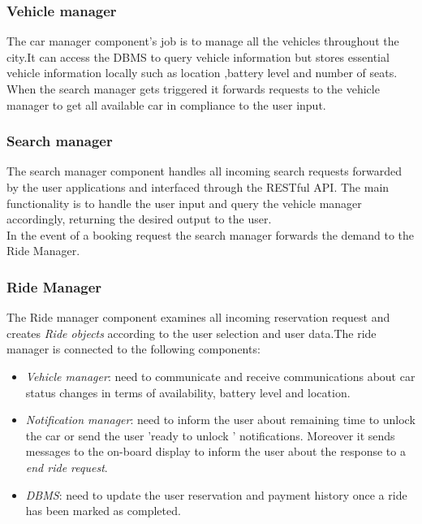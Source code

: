 \subsubsection{Vehicle manager}
The car manager component's job is to manage all the vehicles throughout the city.It can access the DBMS to query vehicle information but stores essential vehicle information locally such as location ,battery level and number of seats. When the search manager gets triggered it forwards requests to the vehicle manager to get all 
available car in compliance to the user input.
\subsubsection{Search manager}
The search manager component handles all incoming search requests forwarded by the user applications and interfaced through the RESTful API. The main functionality is to handle the user input and query the vehicle manager accordingly, returning the desired output to the user.\\In the event of a booking request the search manager forwards the demand to the Ride Manager.
\subsubsection{Ride Manager}
The Ride manager component examines all incoming reservation request and creates \textit{Ride objects} according to the user selection and user data.The ride manager
is connected to the following components:
\begin{itemize}
\item \textit{Vehicle manager}: need to communicate and receive communications about car status changes in terms of availability, battery level and location.
\item \textit{Notification manager}: need to inform the user about remaining time to unlock the car or send the user 'ready to unlock ' notifications. Moreover it sends messages to the on-board display to inform the user about the response to a \textit{end ride request}.
\item \textit{DBMS}: need to update the user reservation and payment history once a ride has been marked as completed.  
\end{itemize}
